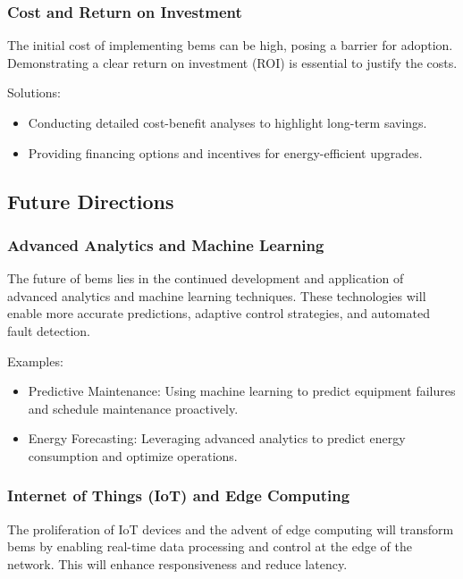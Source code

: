 \subsubsection*{Cost and Return on Investment}

The initial cost of implementing \gls{bems} can be high, posing a barrier for adoption. Demonstrating a clear return on investment (ROI) is essential to justify the costs.

Solutions:
\begin{itemize}
    \item Conducting detailed cost-benefit analyses to highlight long-term savings.
    \item Providing financing options and incentives for energy-efficient upgrades.
\end{itemize}

\subsection*{Future Directions}

\subsubsection*{Advanced Analytics and Machine Learning}

The future of \gls{bems} lies in the continued development and application of advanced analytics and machine learning techniques. These technologies will enable more accurate predictions, adaptive control strategies, and automated fault detection.

Examples:
\begin{itemize}
    \item Predictive Maintenance: Using machine learning to predict equipment failures and schedule maintenance proactively.
    \item Energy Forecasting: Leveraging advanced analytics to predict energy consumption and optimize operations.
\end{itemize}

\subsubsection*{Internet of Things (IoT) and Edge Computing}

The proliferation of IoT devices and the advent of edge computing will transform \gls{bems} by enabling real-time data processing and control at the edge of the network. This will enhance responsiveness and reduce latency.

